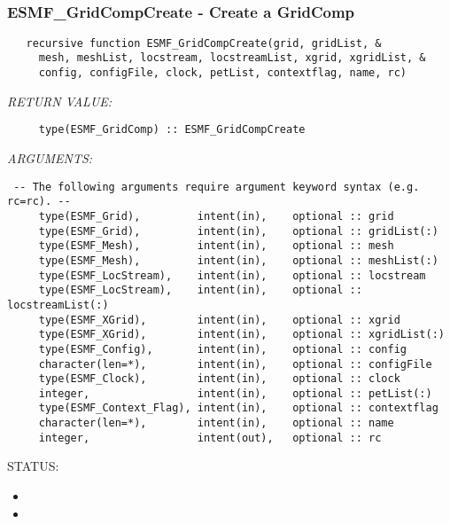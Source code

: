  
\mbox{}\hrulefill\ 
 
\subsubsection [ESMF\_GridCompCreate] {ESMF\_GridCompCreate - Create a GridComp}


  
\begin{verbatim}   recursive function ESMF_GridCompCreate(grid, gridList, &
     mesh, meshList, locstream, locstreamList, xgrid, xgridList, &
     config, configFile, clock, petList, contextflag, name, rc)\end{verbatim}{\em RETURN VALUE:}
\begin{verbatim}     type(ESMF_GridComp) :: ESMF_GridCompCreate\end{verbatim}{\em ARGUMENTS:}
\begin{verbatim} -- The following arguments require argument keyword syntax (e.g. rc=rc). --
     type(ESMF_Grid),         intent(in),    optional :: grid
     type(ESMF_Grid),         intent(in),    optional :: gridList(:)
     type(ESMF_Mesh),         intent(in),    optional :: mesh
     type(ESMF_Mesh),         intent(in),    optional :: meshList(:)
     type(ESMF_LocStream),    intent(in),    optional :: locstream
     type(ESMF_LocStream),    intent(in),    optional :: locstreamList(:)
     type(ESMF_XGrid),        intent(in),    optional :: xgrid
     type(ESMF_XGrid),        intent(in),    optional :: xgridList(:)
     type(ESMF_Config),       intent(in),    optional :: config
     character(len=*),        intent(in),    optional :: configFile
     type(ESMF_Clock),        intent(in),    optional :: clock
     integer,                 intent(in),    optional :: petList(:)
     type(ESMF_Context_Flag), intent(in),    optional :: contextflag
     character(len=*),        intent(in),    optional :: name
     integer,                 intent(out),   optional :: rc\end{verbatim}
{\sf STATUS:}
   \begin{itemize}
   \item{}
   \item{}
   \end{itemize}
  
